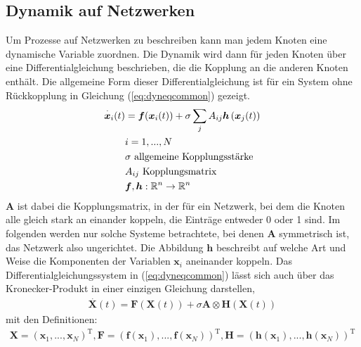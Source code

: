 \subsection{Dynamik auf Netzwerken}
Um Prozesse auf Netzwerken zu beschreiben kann man jedem Knoten eine dynamische Variable zuordnen. Die Dynamik wird dann für jeden Knoten über eine Differentialgleichung beschrieben, die die Kopplung an die anderen Knoten enthält. Die allgemeine Form dieser Differentialgleichung ist für ein System ohne Rückkopplung in Gleichung (\ref*{eq:dyneqcommon}) gezeigt.
\begin{align}\label{eq:dyneqcommon}
\overset{\cdot}{\boldsymbol{x}}_i(t)&=\boldsymbol{f}(\boldsymbol{x}_i(t))+\sigma\sum_j A_{ij}\boldsymbol{h}\left(\boldsymbol{x}_j(t)\right)
\\\notag & i=1,...,N
\\\notag & \sigma \text{ allgemeine Kopplungsstärke}
\\\notag & A_{ij}\text{ Kopplungsmatrix}
\\\notag & \boldsymbol{f},\boldsymbol{h}:\mathbb{R}^n\rightarrow\mathbb{R}^n
\end{align}
$\boldsymbol{A}$ ist dabei die Kopplungsmatrix, in der für ein Netzwerk, bei dem die Knoten alle gleich stark an einander koppeln, die Einträge entweder 0 oder 1 sind. Im folgenden werden nur solche Systeme betrachtete, bei denen $\boldsymbol{A}$ symmetrisch ist, das Netzwerk also ungerichtet. Die Abbildung $\boldsymbol{h}$ beschreibt auf welche Art und Weise die Komponenten der Variablen $\boldsymbol{x}_i$ aneinander koppeln. Das Differentialgleichungssystem in (\ref*{eq:dyneqcommon}) lässt sich auch über das Kronecker-Produkt in einer einzigen Gleichung darstellen,
\begin{align}
\overset{\cdot}{\boldsymbol{X}}(t)=\boldsymbol{F}(\boldsymbol{X}(t))+\sigma\boldsymbol{A}\otimes\boldsymbol{H}(\boldsymbol{X}(t))
\end{align}
mit den Definitionen:
\begin{align*}
\boldsymbol{X}=\left(\boldsymbol{x}_1,...,\boldsymbol{x}_N\right)^{\text{T}},
\boldsymbol{F}=\left(\boldsymbol{f}(\boldsymbol{x}_1),...,\boldsymbol{f}(\boldsymbol{x}_N)\right)^{\text{T}},
\boldsymbol{H}=\left(\boldsymbol{h}(\boldsymbol{x}_1),...,\boldsymbol{h}(\boldsymbol{x}_N)\right)^{\text{T}}
\end{align*}

